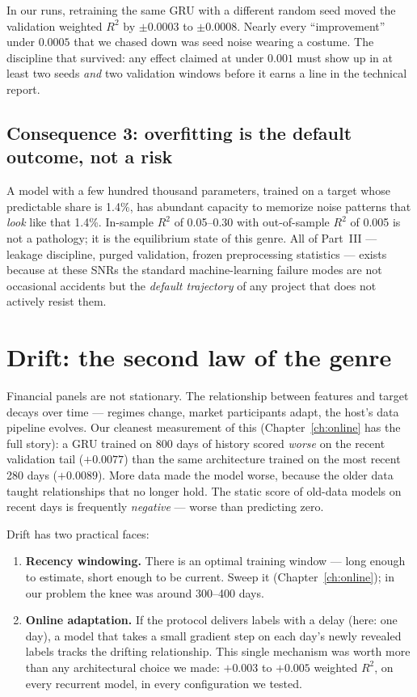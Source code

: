 \begin{jsbox}
In our runs, retraining the same GRU with a different random seed moved the
validation weighted $R^2$ by $\pm 0.0003$ to $\pm 0.0008$. Nearly every
``improvement'' under $0.0005$ that we chased down was seed noise wearing a
costume. The discipline that survived: any effect claimed at under
$0.001$ must show up in at least two seeds \emph{and} two validation
windows before it earns a line in the technical report.
\end{jsbox}

\subsection{Consequence 3: overfitting is the default outcome, not a risk}

A model with a few hundred thousand parameters, trained on a target whose
predictable share is 1.4\%, has abundant capacity to memorize noise patterns
that \emph{look} like that 1.4\%. In-sample $R^2$ of 0.05--0.30 with
out-of-sample $R^2$ of 0.005 is not a pathology; it is the equilibrium state
of this genre. All of Part~III --- leakage discipline, purged validation,
frozen preprocessing statistics --- exists because at these SNRs the standard
machine-learning failure modes are not occasional accidents but the
\emph{default trajectory} of any project that does not actively resist them.

\section{Drift: the second law of the genre}
\label{sec:drift}

Financial panels are not stationary. The relationship between features and
target decays over time --- regimes change, market participants adapt, the
host's data pipeline evolves. Our cleanest measurement of this
(Chapter~\ref{ch:online} has the full story): a GRU trained on 800 days of
history scored \emph{worse} on the recent validation tail ($+0.0077$) than
the same architecture trained on the most recent 280 days ($+0.0089$).
More data made the model worse, because the older data taught relationships
that no longer hold. The static score of old-data models on recent days is
frequently \emph{negative} --- worse than predicting zero.

Drift has two practical faces:

\begin{enumerate}
\item \textbf{Recency windowing.} There is an optimal training window ---
  long enough to estimate, short enough to be current. Sweep it
  (Chapter~\ref{ch:online}); in our problem the knee was around 300--400
  days.
\item \textbf{Online adaptation.} If the protocol delivers labels with a
  delay (here: one day), a model that takes a small gradient step on each
  day's newly revealed labels tracks the drifting relationship. This single
  mechanism was worth more than any architectural choice we made:
  $+0.003$ to $+0.005$ weighted $R^2$, on every recurrent model, in every
  configuration we tested.
\end{enumerate}

